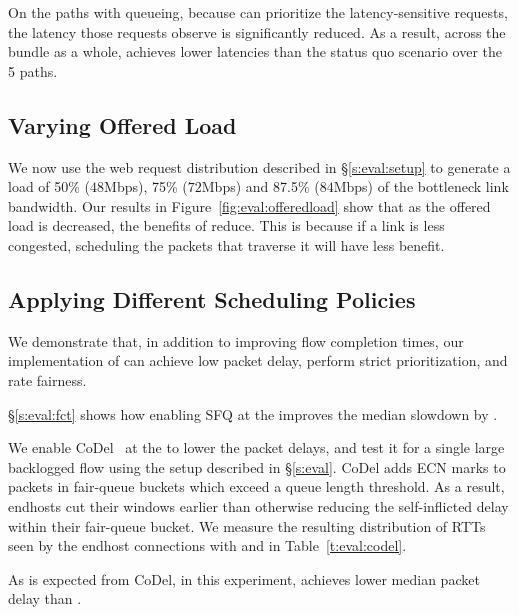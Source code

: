 On the paths with queueing, because \name can prioritize the latency-sensitive requests, the latency those requests observe is significantly reduced. As a result, across the bundle as a whole, \name achieves \realworldMedianLatencyImprovement lower latencies than the status quo scenario over the 5 paths.



\begin{Appendix}
\section{Varying Offered Load}\label{s:eval:offeredload}
We now use the web request distribution described in \S\ref{s:eval:setup} to generate a load of 50\% ($48$Mbps), 75\% ($72$Mbps) and 87.5\% ($84$Mbps) of the bottleneck link bandwidth. Our results in Figure~\ref{fig:eval:offeredload} show that as the offered load is decreased, the benefits of \name reduce. This is because if a link is less congested, scheduling the packets that traverse it will have less benefit.


\end{Appendix}

\subsection{Applying Different Scheduling Policies}\label{s:eval:policies}
We demonstrate that, in addition to improving flow completion times, our implementation of \name can achieve low packet delay, perform strict prioritization, and rate fairness.

 \S\ref{s:eval:fct} shows how enabling SFQ at the \name improves the median slowdown by \overviewBenefitsBundlerMedianImprovement.

We enable CoDel~\cite{fq-codel} at the \inbox to lower the packet delays, and test it for a single large backlogged flow using the setup described in \S\ref{s:eval}.
CoDel adds ECN marks to packets in fair-queue buckets which exceed a queue length threshold. 
As a result, endhosts cut their windows earlier than otherwise reducing the self-inflicted delay within their fair-queue bucket.
We measure the resulting distribution of RTTs seen by the endhost connections with \name and \baseline in Table~\ref{t:eval:codel}.

As is expected from CoDel, \name in this experiment, achieves \delaysImprovement lower median packet delay than \baseline.


